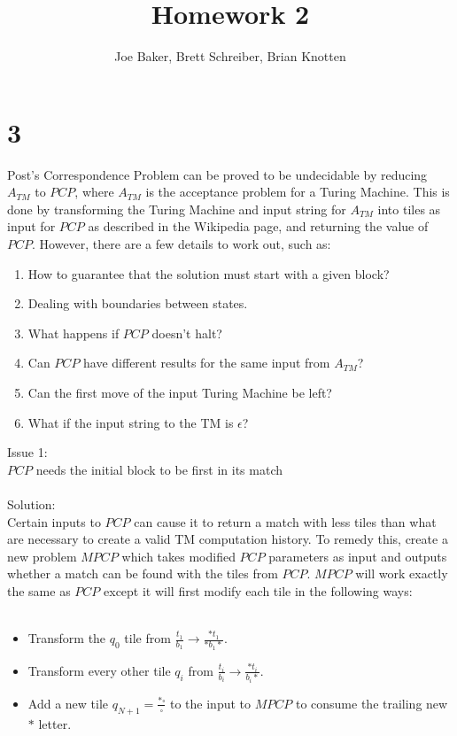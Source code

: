 \documentclass[letterpaper,notitlepage,twoside]{article}
\begin{document}
\title{Homework 2}
\author{Joe Baker, Brett Schreiber, Brian Knotten}
\maketitle


\section*{3}
Post's Correspondence Problem can be proved to be undecidable by reducing $A_{TM}$ to $PCP$, where $A_{TM}$ is the acceptance problem for a Turing Machine. This is done by transforming the Turing Machine and input string for $A_{TM}$ into tiles as input for $PCP$ as described in the Wikipedia page, and returning the value of $PCP$. However, there are a few details to work out, such as:
\begin{enumerate}
\item How to guarantee that the solution must start with a given block?
\item Dealing with boundaries between states.
\item What happens if $PCP$ doesn't halt?
\item Can $PCP$ have different results for the same input from $A_{TM}$?
\item Can the first move of the input Turing Machine be left?
\item What if the input string to the TM is $\epsilon$?
\end{enumerate}
Issue 1:\\
$PCP$ needs the initial block to be first in its match\\\\
Solution:\\
Certain inputs to $PCP$ can cause it to return a match with less tiles than what are necessary to create a valid TM computation history. To remedy this, create a new problem $MPCP$ which takes modified $PCP$ parameters as input and outputs whether a match can be found with the tiles from $PCP$. $MPCP$ will work exactly the same as $PCP$ except it will first modify each tile in the following ways:\\\\
\begin{itemize}
\item Transform the $q_0$ tile from $\frac{t_1}{b_1} \rightarrow \frac{*t_1}{*b_1*}$.
\item Transform every other tile $q_i$ from $\frac{t_i}{b_i} \rightarrow \frac{*t_i}{b_i*}$.
\item Add a new tile $q_{N+1} = \frac{*\square}{\square}$ to the input to $MPCP$ to consume the trailing new $*$ letter.
\end{itemize}
\end{document}
